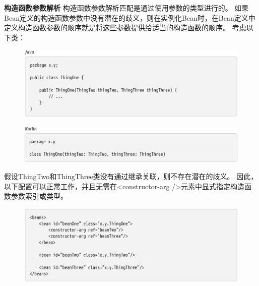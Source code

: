 \newpage
\textbf{构造函数参数解析} 构造函数参数解析匹配是通过使用参数的类型进行的。 如果Bean定义的构造函数参数中没有潜在的歧义，则在实例化Bean时，在Bean定义中定义构造函数参数的顺序就是将这些参数提供给适当的构造函数的顺序。 考虑以下类：

\begin{figure}[ht]
    \centering
    \includegraphics[width=1\linewidth]{./Figure/IMG_code_22.png}
\end{figure}
\begin{figure}[ht]
    \centering
    \includegraphics[width=1\linewidth]{./Figure/IMG_code_23.png}
\end{figure}

假设ThingTwo和ThingThree类没有通过继承关联，则不存在潜在的歧义。 因此，以下配置可以正常工作，并且无需在<constructor-arg />元素中显式指定构造函数参数索引或类型。

\begin{figure}[ht]
    \centering
    \includegraphics[width=1\linewidth]{./Figure/IMG_code_24.png}
\end{figure}

